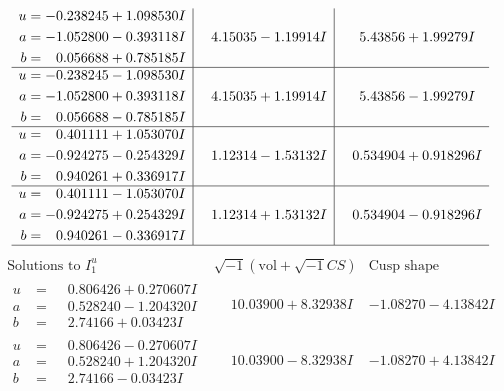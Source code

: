\documentclass[1p]{elsarticle_modified}
\theoremstyle{definition}
\newcommand{\I}{\sqrt{-1}}
\begin{document}
$$\begin{array}{c|c|c}
\begin{aligned}
u &= -0.238245 + 1.098530 I \\
a &= -1.052800 - 0.393118 I \\
b &= \phantom{-}0.056688 + 0.785185 I\end{aligned}
 & \phantom{-}4.15035 - 1.19914 I & \phantom{-}5.43856 + 1.99279 I \\ \hline\begin{aligned}
u &= -0.238245 - 1.098530 I \\
a &= -1.052800 + 0.393118 I \\
b &= \phantom{-}0.056688 - 0.785185 I\end{aligned}
 & \phantom{-}4.15035 + 1.19914 I & \phantom{-}5.43856 - 1.99279 I \\ \hline\begin{aligned}
u &= \phantom{-}0.401111 + 1.053070 I \\
a &= -0.924275 - 0.254329 I \\
b &= \phantom{-}0.940261 + 0.336917 I\end{aligned}
 & \phantom{-}1.12314 - 1.53132 I & \phantom{-}0.534904 + 0.918296 I \\ \hline\begin{aligned}
u &= \phantom{-}0.401111 - 1.053070 I \\
a &= -0.924275 + 0.254329 I \\
b &= \phantom{-}0.940261 - 0.336917 I\end{aligned}
 & \phantom{-}1.12314 + 1.53132 I & \phantom{-}0.534904 - 0.918296 I\\
 \hline 
 \end{array}$$\newpage$$\begin{array}{c|c|c}  
\text{Solutions to }I^u_{1}& \I (\text{vol} + \sqrt{-1}CS) & \text{Cusp shape}\\
 \hline 
\begin{aligned}
u &= \phantom{-}0.806426 + 0.270607 I \\
a &= \phantom{-}0.528240 - 1.204320 I \\
b &= \phantom{-}2.74166 + 0.03423 I\end{aligned}
 & \phantom{-}10.03900 + 8.32938 I & -1.08270 - 4.13842 I \\ \hline\begin{aligned}
u &= \phantom{-}0.806426 - 0.270607 I \\
a &= \phantom{-}0.528240 + 1.204320 I \\
b &= \phantom{-}2.74166 - 0.03423 I\end{aligned}
 & \phantom{-}10.03900 - 8.32938 I & -1.08270 + 4.13842 I \\ \hline\begin{aligned}

\end{aligned}
\end{array}$$
\end{document}

